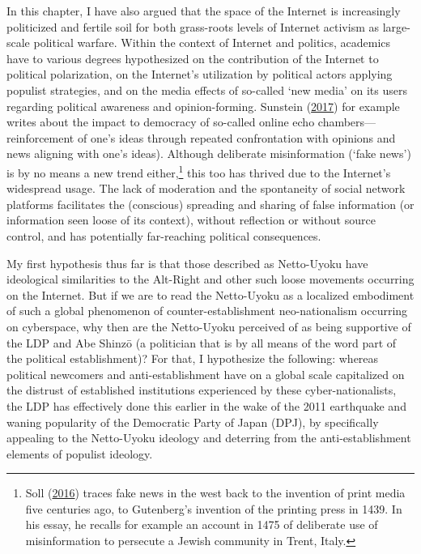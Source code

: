 \documentclass[10pt,british,A4paper,,openany]{memoir}
\begin{document}
In this chapter, I have also argued that the space of the Internet is
increasingly politicized and fertile soil for both grass-roots levels of
Internet activism as large-scale political warfare. Within the context
of Internet and politics, academics have to various degrees hypothesized
on the contribution of the Internet to political polarization, on the
Internet's utilization by political actors applying populist strategies,
and on the media effects of so-called `new media' on its users regarding
political awareness and opinion-forming. Sunstein
(\protect\hyperlink{ref-sunstein_republic:_2017}{2017}) for example
writes about the impact to democracy of so-called online echo
chambers---reinforcement of one's ideas through repeated confrontation
with opinions and news aligning with one's ideas). Although deliberate
misinformation (`fake news') is by no means a new trend
either,\footnote{Soll (\protect\hyperlink{ref-soll_long_2016}{2016})
  traces fake news in the west back to the invention of print media five
  centuries ago, to Gutenberg's invention of the printing press in 1439.
  In his essay, he recalls for example an account in 1475 of deliberate
  use of misinformation to persecute a Jewish community in Trent, Italy.}
this too has thrived due to the Internet's widespread usage. The lack of
moderation and the spontaneity of social network platforms facilitates
the (conscious) spreading and sharing of false information (or
information seen loose of its context), without reflection or without
source control, and has potentially far-reaching political consequences.

My first hypothesis thus far is that those described as Netto-Uyoku have
ideological similarities to the Alt-Right and other such loose movements
occurring on the Internet. But if we are to read the Netto-Uyoku as a
localized embodiment of such a global phenomenon of
counter-establishment neo-nationalism occurring on cyberspace, why then
are the Netto-Uyoku perceived of as being supportive of the LDP and Abe
Shinzō (a politician that is by all means of the word part of the
political establishment)? For that, I hypothesize the following: whereas
political newcomers and anti-establishment have on a global scale
capitalized on the distrust of established institutions experienced by
these cyber-nationalists, the LDP has effectively done this earlier in
the wake of the 2011 earthquake and waning popularity of the Democratic
Party of Japan (DPJ), by specifically appealing to the Netto-Uyoku
ideology and deterring from the anti-establishment elements of populist
ideology.
\end{document}
